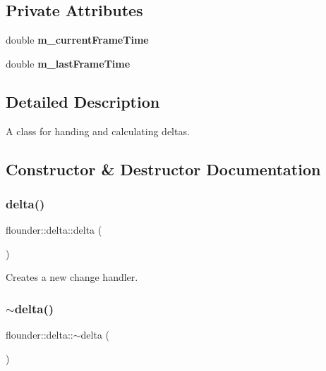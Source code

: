 \subsection*{Private Attributes}
\begin{DoxyCompactItemize}
\item 
\mbox{\label{classflounder_1_1delta_a922814fee4d3ad0be3f643b1801c9328}} 
double {\bfseries m\+\_\+current\+Frame\+Time}
\item 
\mbox{\label{classflounder_1_1delta_ac623d44d1250523c1b54801450924f7c}} 
double {\bfseries m\+\_\+last\+Frame\+Time}
\end{DoxyCompactItemize}


\subsection{Detailed Description}
A class for handing and calculating deltas. 



\subsection{Constructor \& Destructor Documentation}
\mbox{\label{classflounder_1_1delta_a6996799d2f9423e994e2beb84dc3ba09}} 
\subsubsection{\texorpdfstring{delta()}{delta()}}
{\footnotesize\ttfamily flounder\+::delta\+::delta (\begin{DoxyParamCaption}{ }\end{DoxyParamCaption})}



Creates a new change handler. 

\mbox{\label{classflounder_1_1delta_af9eb174b15b3730a45a903e988dac1e8}} 
\subsubsection{\texorpdfstring{$\sim$delta()}{~delta()}}
{\footnotesize\ttfamily flounder\+::delta\+::$\sim$delta (\begin{DoxyParamCaption}{ }\end{DoxyParamCaption})}



